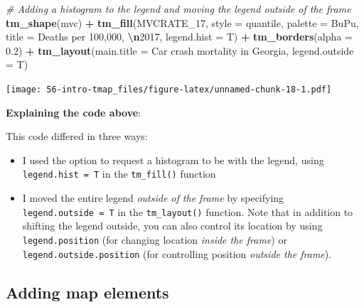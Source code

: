 \documentclass[
]{book}
\newenvironment{Shaded}{\begin{snugshade}}{\end{snugshade}}
\newcommand{\AttributeTok}[1]{\textcolor[rgb]{0.13,0.29,0.53}{#1}}
\newcommand{\CommentTok}[1]{\textcolor[rgb]{0.56,0.35,0.01}{\textit{#1}}}
\newcommand{\FloatTok}[1]{\textcolor[rgb]{0.00,0.00,0.81}{#1}}
\newcommand{\FunctionTok}[1]{\textcolor[rgb]{0.13,0.29,0.53}{\textbf{#1}}}
\newcommand{\NormalTok}[1]{#1}
\newcommand{\SpecialCharTok}[1]{\textcolor[rgb]{0.81,0.36,0.00}{\textbf{#1}}}
\newcommand{\StringTok}[1]{\textcolor[rgb]{0.31,0.60,0.02}{#1}}
\providecommand{\tightlist}{%
  \setlength{\itemsep}{0pt}\setlength{\parskip}{0pt}}
\begin{document}
\begin{Shaded}
\begin{Highlighting}[]
\CommentTok{\# Adding a histogram to the legend and moving the legend outside of the frame}
\FunctionTok{tm\_shape}\NormalTok{(mvc) }\SpecialCharTok{+}
  \FunctionTok{tm\_fill}\NormalTok{(}\StringTok{\textquotesingle{}MVCRATE\_17\textquotesingle{}}\NormalTok{,}
          \AttributeTok{style =} \StringTok{\textquotesingle{}quantile\textquotesingle{}}\NormalTok{,}
          \AttributeTok{palette =} \StringTok{\textquotesingle{}BuPu\textquotesingle{}}\NormalTok{,}
          \AttributeTok{title =} \StringTok{\textquotesingle{}Deaths per 100,000, }\SpecialCharTok{\textbackslash{}n}\StringTok{2017\textquotesingle{}}\NormalTok{,}
          \AttributeTok{legend.hist =}\NormalTok{ T) }\SpecialCharTok{+}
  \FunctionTok{tm\_borders}\NormalTok{(}\AttributeTok{alpha =} \FloatTok{0.2}\NormalTok{) }\SpecialCharTok{+}
  \FunctionTok{tm\_layout}\NormalTok{(}\AttributeTok{main.title =} \StringTok{\textquotesingle{}Car crash mortality in Georgia\textquotesingle{}}\NormalTok{,}
            \AttributeTok{legend.outside =}\NormalTok{ T)}
\end{Highlighting}
\end{Shaded}

\texttt{[image: 56-intro-tmap\_files/figure-latex/unnamed-chunk-18-1.pdf]}

\textbf{Explaining the code above}:

This code differed in three ways:

\begin{itemize}
\tightlist
\item
  I used the option to request a histogram to be with the legend, using \texttt{legend.hist\ =\ T} in the \texttt{tm\_fill()} function
\item
  I moved the entire legend \emph{outside of the frame} by specifying \texttt{legend.outside\ =\ T} in the \texttt{tm\_layout()} function. Note that in addition to shifting the legend outside, you can also control its location by using \texttt{legend.position} (for changing location \emph{inside the frame}) or \texttt{legend.outside.position} (for controlling position \emph{outside the frame}).
\end{itemize}

\hypertarget{adding-map-elements}{%
\subsection{Adding map elements}\label{adding-map-elements}}
\end{document}
